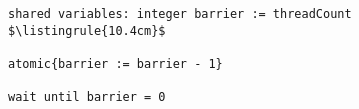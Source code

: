 \begin{center}
\begin{minipage}{\textwidth}
\begin{lstlisting}[mathescape, linewidth=10.4cm]
shared variables: integer barrier := threadCount
$\listingrule{10.4cm}$

atomic{barrier := barrier - 1}

wait until barrier = 0
\end{lstlisting}
\end{minipage}
\end{center}
